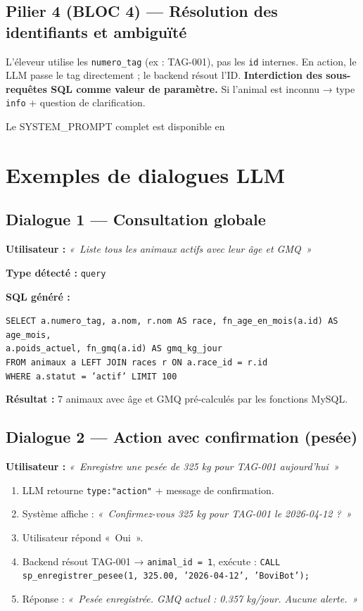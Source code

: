\documentclass[12pt, a4paper, oneside]{report}
\newcommand{\annexeref}[1]{%
  \tcbox[colback=bovilight, colframe=bovibrown, arc=2pt,
         boxsep=1pt, left=3pt, right=3pt, top=1pt, bottom=1pt,
         on line, boxrule=0.5pt]{%
    \small\color{bovibrown}$\hookrightarrow$~\hyperref[#1]{Annexe~\ref{#1}, p.~\pageref{#1}}%
  }%
}
\begin{document}
\subsection{Pilier 4 (BLOC 4) — Résolution des identifiants et ambiguïté}

L'éleveur utilise les \texttt{numero\_tag} (ex : TAG-001), pas les \texttt{id} internes.
En action, le LLM passe le tag directement ; le backend résout l'ID.
\textbf{Interdiction des sous-requêtes SQL comme valeur de paramètre.}
Si l'animal est inconnu → type \texttt{info} + question de clarification.

\medskip\noindent Le SYSTEM\_PROMPT complet est disponible en~\annexeref{app:sysprompt}

\section{Exemples de dialogues LLM}

\subsection{Dialogue 1 — Consultation globale}

\textbf{Utilisateur :} \textit{«~Liste tous les animaux actifs avec leur âge et GMQ~»}

\textbf{Type détecté :} \texttt{query}

\textbf{SQL généré :}
\begin{center}\small
\texttt{SELECT a.numero\_tag, a.nom, r.nom AS race, fn\_age\_en\_mois(a.id) AS age\_mois,\\
a.poids\_actuel, fn\_gmq(a.id) AS gmq\_kg\_jour\\
FROM animaux a LEFT JOIN races r ON a.race\_id = r.id\\
WHERE a.statut = 'actif' LIMIT 100}
\end{center}

\textbf{Résultat :} 7 animaux avec âge et GMQ pré-calculés par les fonctions MySQL.

\subsection{Dialogue 2 — Action avec confirmation (pesée)}

\textbf{Utilisateur :} \textit{«~Enregistre une pesée de 325 kg pour TAG-001 aujourd'hui~»}

\begin{enumerate}[itemsep=2pt]
  \item LLM retourne \texttt{type:"action"} + message de confirmation.
  \item Système affiche : \textit{«~Confirmez-vous 325 kg pour TAG-001 le 2026-04-12 ?~»}
  \item Utilisateur répond «~Oui~».
  \item Backend résout TAG-001 → \texttt{animal\_id = 1}, exécute :
    \texttt{CALL sp\_enregistrer\_pesee(1, 325.00, '2026-04-12', 'BoviBot');}
  \item Réponse : \textit{«~Pesée enregistrée. GMQ actuel : 0.357 kg/jour. Aucune alerte.~»}
\end{enumerate}
\end{document}
